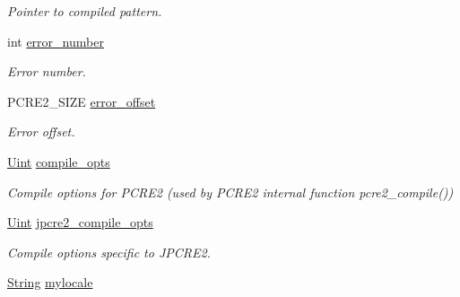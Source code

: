 \begin{DoxyCompactItemize}
\begin{DoxyCompactList}\small\item\em Pointer to compiled pattern. \end{DoxyCompactList}\item 
int \hyperlink{classjpcre2_1_1Regex_a91b7b795c9efe76ef4e015325ff33f1c}{error\+\_\+number}\hypertarget{classjpcre2_1_1Regex_a91b7b795c9efe76ef4e015325ff33f1c}{}\label{classjpcre2_1_1Regex_a91b7b795c9efe76ef4e015325ff33f1c}

\begin{DoxyCompactList}\small\item\em Error number. \end{DoxyCompactList}\item 
P\+C\+R\+E2\+\_\+\+S\+I\+ZE \hyperlink{classjpcre2_1_1Regex_a0b9613704582b9c6b0175a21a2a421e0}{error\+\_\+offset}\hypertarget{classjpcre2_1_1Regex_a0b9613704582b9c6b0175a21a2a421e0}{}\label{classjpcre2_1_1Regex_a0b9613704582b9c6b0175a21a2a421e0}

\begin{DoxyCompactList}\small\item\em Error offset. \end{DoxyCompactList}\item 
\hyperlink{namespacejpcre2_a078242d38221a13fb3543b9edd78c099}{Uint} \hyperlink{classjpcre2_1_1Regex_a5954131e9085de63229ed5c11417df69}{compile\+\_\+opts}\hypertarget{classjpcre2_1_1Regex_a5954131e9085de63229ed5c11417df69}{}\label{classjpcre2_1_1Regex_a5954131e9085de63229ed5c11417df69}

\begin{DoxyCompactList}\small\item\em Compile options for P\+C\+R\+E2 (used by P\+C\+R\+E2 internal function pcre2\+\_\+compile()) \end{DoxyCompactList}\item 
\hyperlink{namespacejpcre2_a078242d38221a13fb3543b9edd78c099}{Uint} \hyperlink{classjpcre2_1_1Regex_abdd26c3bc1c3132f0aa73dde1690a7ef}{jpcre2\+\_\+compile\+\_\+opts}\hypertarget{classjpcre2_1_1Regex_abdd26c3bc1c3132f0aa73dde1690a7ef}{}\label{classjpcre2_1_1Regex_abdd26c3bc1c3132f0aa73dde1690a7ef}

\begin{DoxyCompactList}\small\item\em Compile options specific to J\+P\+C\+R\+E2. \end{DoxyCompactList}\item 
\hyperlink{namespacejpcre2_a91f03070152fb228bc116c5a737f1d16}{String} \hyperlink{classjpcre2_1_1Regex_a92a3ad992cade62d103248302f7e2f2d}{mylocale}\hypertarget{classjpcre2_1_1Regex_a92a3ad992cade62d103248302f7e2f2d}{}\label{classjpcre2_1_1Regex_a92a3ad992cade62d103248302f7e2f2d}


\end{DoxyCompactItemize}
